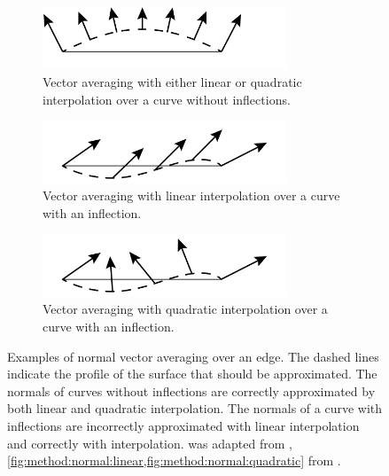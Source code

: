 	\begin{figure}
		\centering
		\begin{subfigure}{\columnwidth}
			\centering
			\includegraphics[width=0.8\textwidth]{./content/img/method/linearVsQuadraticNormals_both.png}
			\caption{Vector averaging with either linear or quadratic interpolation over a curve without inflections.}
			\label{fig:method:normal:both}
		\end{subfigure}
		\begin{subfigure}{\columnwidth}
			\centering
			\includegraphics[width=0.8\textwidth]{./content/img/method/linearVsQuadraticNormals_linear}
			\caption{Vector averaging with linear interpolation over a curve with an inflection.}
			\label{fig:method:normal:linear}
		\end{subfigure}	
		\begin{subfigure}{\columnwidth}
			\centering
			\includegraphics[width=0.8\textwidth]{./content/img/method/linearVsQuadraticNormals_quadratic}
			\caption{Vector averaging with quadratic interpolation over a curve with an inflection.}
			\label{fig:method:normal:quadratic}
		\end{subfigure}			
		\caption{Examples of normal vector averaging over an edge. The dashed lines indicate the profile of the surface that should be approximated.  The normals of curves without inflections are correctly approximated by both linear and quadratic interpolation. The normals of a curve with inflections are incorrectly approximated with  linear interpolation and correctly with  interpolation. 
%
		 was adapted from \textcite{van1997phong}, \cref{fig:method:normal:linear,fig:method:normal:quadratic} from \textcite{vlachos2001curved}.}
		\label{fig:method:linear_vs_quadratically_varying}
	\end{figure}

